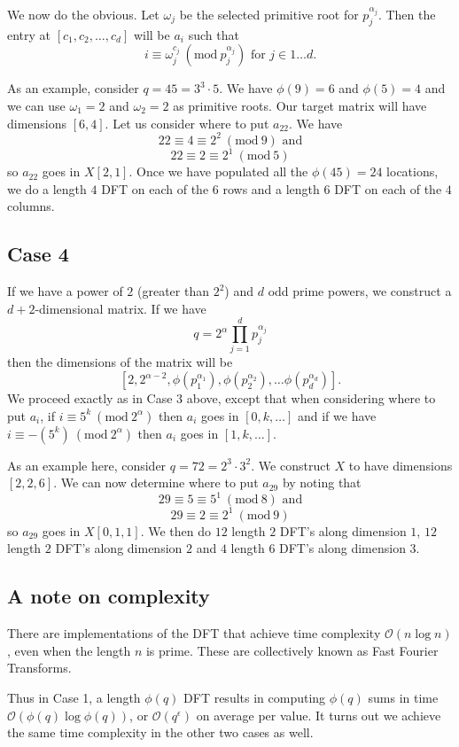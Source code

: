 \documentclass[12pt]{amsart}
\newcommand{\Mod}[1]{\ (\mathrm{mod}\ #1)}
\theoremstyle{remark}
\numberwithin{theorem}{section}
\numberwithin{equation}{section}
\begin{document}
We now do the obvious. Let $\omega_j$ be the selected primitive root for $p_j^{\alpha_j}$. Then the entry at $[c_1,c_2,\ldots,c_d]$ will be $a_i$ such that
$$
i \equiv\omega_j^{c_j}\Mod {p_j^{\alpha_j}}\textrm{ for }j\in{1\ldots d}.
$$

As an example, consider $q=45=3^3\cdot 5$. We have $\phi(9)=6$ and $\phi(5)=4$ and we can use $\omega_1=2$ and $\omega_2=2$ as primitive roots. Our target matrix will have dimensions $[6,4]$. Let us consider where to put $a_{22}$. We have
$$
22\equiv 4 \equiv 2^2\Mod{9}\textrm{ and}
$$
$$
22\equiv 2 \equiv 2^1\Mod{5}
$$
so $a_{22}$ goes in $X[2,1]$. Once we have populated all the $\phi(45)=24$ locations, we do a length $4$ DFT on each of the $6$ rows and a length $6$ DFT on each of the $4$ columns. 

\subsection{Case 4}

If we have a power of $2$ (greater than $2^2$) and $d$ odd prime powers, we construct a $d+2$-dimensional matrix.
If we have
$$
q=2^\alpha\prod_{j=1}^dp_j^{\alpha_j}
$$
then the dimensions of the matrix will be
$$
[2,2^{\alpha-2},\phi(p_1^{\alpha_1}),\phi(p_2^{\alpha_2}),\ldots\phi(p_d^{\alpha_d})].
$$
We proceed exactly as in Case 3 above, except that when considering where to put $a_i$, if $i\equiv 5^k\Mod{2^\alpha}$ then $a_i$ goes in $[0,k,\ldots]$ and if we have $i\equiv -(5^k)\Mod{2^\alpha}$ then $a_i$ goes in $[1,k,\ldots]$.

As an example here, consider $q=72=2^3\cdot3^2$. We construct $X$ to have dimensions $[2,2,6]$. We can now determine where to put $a_{29}$ by noting that
$$
29\equiv 5 \equiv 5^1 \Mod{8}\textrm{ and}
$$
$$
29\equiv 2 \equiv 2^1 \Mod{9}
$$
so $a_{29}$ goes in $X[0,1,1]$. We then do $12$ length $2$ DFT's along dimension $1$, $12$ length $2$ DFT's along dimension $2$ and $4$ length $6$ DFT's along dimension $3$.

\subsection{A note on complexity}

There are implementations of the DFT that achieve time complexity $\mathcal{O}(n\log n)$, even when the length $n$ is prime. These are collectively known as Fast Fourier Transforms.

Thus in Case 1, a length $\phi(q)$ DFT results in computing $\phi(q)$ sums in time $\mathcal{O}(\phi(q)\log\phi(q))$, or $\mathcal{O}(q^\epsilon)$ on average per value. It turns out we achieve the same time complexity in the other two cases as well.
\end{document}
